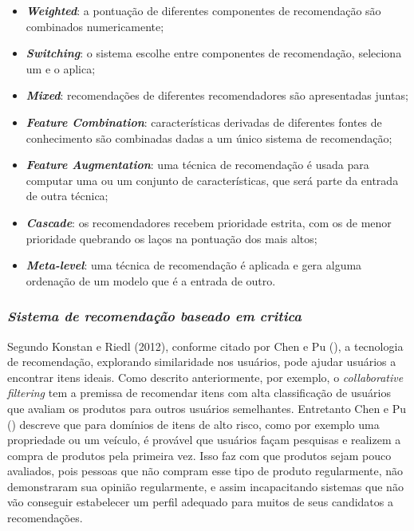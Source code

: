 \begin{itemize}
    \item \textbf{\textit{Weighted}}: a pontuação de diferentes componentes de recomendação são combinados numericamente;
    
    \item \textbf{\textit{Switching}}: o sistema escolhe entre componentes de recomendação, seleciona um e o aplica;
    
    \item \textbf{\textit{Mixed}}: recomendações de diferentes recomendadores são apresentadas juntas;
    
    \item \textbf{\textit{Feature Combination}}: características derivadas de diferentes fontes de conhecimento são combinadas dadas a um único sistema de recomendação;
    
    \item \textbf{\textit{Feature Augmentation}}:  uma técnica de recomendação é usada para computar uma ou um conjunto de características, que será parte da entrada de outra técnica;
    
    \item \textbf{\textit{Cascade}}: os recomendadores recebem prioridade estrita, com os de menor prioridade quebrando os laços na pontuação dos mais altos;

    \item \textbf{\textit{Meta-level}}: uma técnica de recomendação é aplicada e gera alguma ordenação de um modelo que é a entrada de outro.

\end{itemize}

\subsubsection{\textit{Sistema de recomendação baseado em critica}}
\label{Critiquing-based}
Segundo Konstan e Riedl (2012), conforme citado por Chen e Pu (\citeyear{Chen:2012}), a tecnologia de recomendação, explorando similaridade nos usuários, pode ajudar usuários a encontrar itens ideais. Como descrito anteriormente, por exemplo, o \textit{collaborative filtering} tem a premissa de recomendar itens com alta classificação de usuários que avaliam os produtos para outros usuários semelhantes. Entretanto Chen e Pu (\citeyear{Chen:2012}) descreve que para domínios de itens de alto risco, como por exemplo uma propriedade ou um veículo, é provável que usuários façam pesquisas e realizem a compra de produtos pela primeira vez. Isso faz com que produtos sejam pouco avaliados, pois pessoas que não compram esse tipo de produto regularmente, não demonstraram sua opinião regularmente, e assim incapacitando sistemas que não vão conseguir estabelecer um perfil adequado para muitos de seus candidatos a recomendações.

